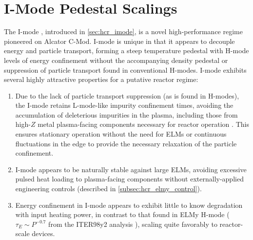 \chapter{I-Mode Pedestal Scalings}\label{ch:ImodePedestal}

The I-mode \cite{Whyte2010,Hubbard2011}, introduced in \cref{sec:hcr_imode}, is a novel high-performance regime pioneered on Alcator C-Mod.  I-mode is unique in that it appears to decouple energy and particle transport, forming a steep temperature pedestal with H-mode levels of energy confinement without the accompanying density pedestal or suppression of particle transport found in conventional H-modes.  I-mode exhibits several highly attractive properties for a putative reactor regime:

\begin{enumerate}
 \item Due to the lack of particle transport suppression (as is found in H-modes), the I-mode retains L-mode-like impurity confinement times, avoiding the accumulation of deleterious impurities in the plasma, including those from high-$Z$ metal plasma-facing components necessary for reactor operation \cite{Loarte2007}.  This ensures stationary operation without the need for ELMs or continuous fluctuations in the edge to provide the necessary relaxation of the particle confinement.
 \item I-mode appears to be naturally stable against large ELMs, avoiding excessive pulsed heat loading to plasma-facing components without externally-applied engineering controls (described in \cref{subsec:hcr_elmy_control}).
 \item Energy confinement in I-mode appears to exhibit little to know degradation with input heating power, in contrast to that found in ELMy H-mode ($\tau_E \sim P^{-0.7}$ from the ITER98y2 analysis \cite{ITER1999}), scaling quite favorably to reactor-scale devices.
\end{enumerate}

